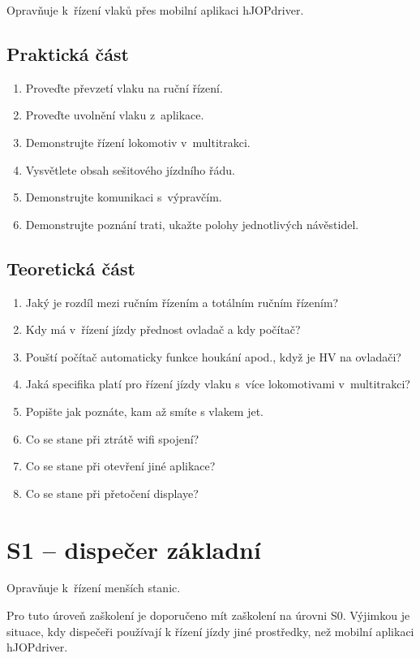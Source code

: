 \documentclass[12pt,a4paper]{article}
\begin{document}
Opravňuje k~řízení vlaků přes mobilní aplikaci hJOPdriver.

\subsection{Praktická část}

\begin{enumerate}[leftmargin=*]
\item Proveďte převzetí vlaku na ruční řízení.
\item Proveďte uvolnění vlaku z~aplikace.
\item Demonstrujte řízení lokomotiv v~multitrakci.
\item Vysvětlete obsah sešitového jízdního řádu.
\item Demonstrujte komunikaci s~výpravčím.
\item Demonstrujte poznání trati, ukažte polohy jednotlivých návěstidel.
\end{enumerate}

\subsection{Teoretická část}
\begin{enumerate}[leftmargin=*]
\item Jaký je rozdíl mezi ručním řízením a totálním ručním řízením?
\item Kdy má v~řízení jízdy přednost ovladač a kdy počítač?
\item Pouští počítač automaticky funkce houkání apod., když je HV na ovladači?
\item Jaká specifika platí pro řízení jízdy vlaku s~více lokomotivami v~multitrakci?
\item Popište jak poznáte, kam až smíte s vlakem jet.
\item Co se stane při ztrátě wifi spojení?
\item Co se stane při otevření jiné aplikace?
\item Co se stane při přetočení displaye?
\end{enumerate}

\newpage

\section{S1 – dispečer základní}

Opravňuje k~řízení menších stanic.

Pro tuto úroveň zaškolení je doporučeno mít zaškolení na úrovni S0. Výjimkou
je situace, kdy dispečeři používají k řízení jízdy jiné prostředky, než mobilní
aplikaci hJOPdriver.
\end{document}
